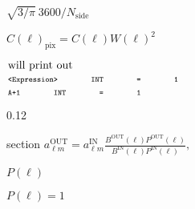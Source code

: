 \documentclass[12pt,twoside]{article}
\newcommand{\newedenvironment}[1]{\newenvironment{#1}{}{}\renewenvironment{#1}}%
\def\lthtmlcheckvsize{\ifdim\ht\sizebox<\vsize 
  \ifdim\wd\sizebox<\hsize\expandafter\hfill\fi \expandafter\vfill
  \else\expandafter\vss\fi}%
\begin{document}
\renewcommand{\l}{{$\ell$\  }}
{\newpage\clearpage
{}%
$ \sqrt{3/\pi}\ 3600/N_{\mathrm{side}}$%
\lthtmlindisplaymathZ
\lthtmlcheckvsize\clearpage}

{\newpage\clearpage
{}%
$C(\ell)_{\mathrm{pix}} = C(\ell)
W(\ell)^2$%
\lthtmlindisplaymathZ
\lthtmlcheckvsize\clearpage}

{\newpage\clearpage
{}%
$\textstyle \parbox{\hsize}{
will print out
\\
{\scriptsize{\texttt{ 
<Expression>    \hspace{3em} INT  \hspace{3em}     =   \hspace{3em}     1 \\
A+1             \hspace{3em} INT   \hspace{3em}    =   \hspace{3em}     1
}}}
}$%
\lthtmlindisplaymathZ
\lthtmlcheckvsize\clearpage}



\newedenvironment{qualifiers_hpx2dm}{\rule{\hsize}{0.7mm}
     \textsc{\Large{\textbf{QUALIFIERS}}}\hfill\newline \renewcommand {\arraystretch}{1.5}%
	}%


%
\providecommand{\sizeoneg}{0.12\hsize}%


%
\providecommand{\sizethrg}{0.85\hsize}%



\newedenvironment{qualifiers_hpx2gs}{\rule{\hsize}{0.7mm}
     \textsc{\Large{\textbf{QUALIFIERS}}}\hfill\newline \renewcommand {\arraystretch}{1.5}%
	}%

\stepcounter{section}
{\newpage\clearpage
{}%
$\displaystyle a_{\ell m}^\mathrm{OUT} = a_{\ell m}^\mathrm{IN} 
 \frac{B^\mathrm{OUT}(\ell) P^\mathrm{OUT}(\ell)}{B^\mathrm{IN}(\ell) 
 P^\mathrm{IN}(\ell)},$%
\lthtmlindisplaymathZ
\lthtmlcheckvsize\clearpage}

{\newpage\clearpage
{}%
$P(\ell)$%
\lthtmlindisplaymathZ
\lthtmlcheckvsize\clearpage}

{\newpage\clearpage
{}%
$P(\ell) =
 1$%
\lthtmlindisplaymathZ
\lthtmlcheckvsize\clearpage}
\end{document}
